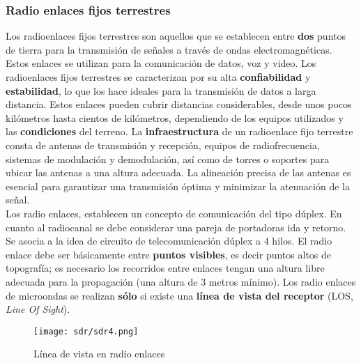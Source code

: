 \documentclass[
	12pt, %
	fleqn, %
	a4paper, %
	oneside, %
]{LegrandOrangeBook}
\begin{document}
\subsubsection{Radio enlaces fijos terrestres}
Los radioenlaces fijos terrestres son aquellos que se establecen entre \textbf{dos} puntos de tierra para la transmisión de señales a través de ondas electromagnéticas. Estos enlaces se utilizan para la comunicación de datos, voz y video. Los radioenlaces fijos terrestres se caracterizan por su alta \textbf{confiabilidad} y \textbf{estabilidad}, lo que los hace ideales para la transmisión de datos a larga distancia. Estos enlaces pueden cubrir distancias considerables, desde unos pocos kilómetros hasta cientos de kilómetros, dependiendo de los equipos utilizados y las \textbf{condiciones} del terreno. La \textbf{infraestructura} de un radioenlace fijo terrestre consta de antenas de transmisión y recepción, equipos de radiofrecuencia, sistemas de modulación y demodulación, así como de torres o soportes para ubicar las antenas a una altura adecuada. La alineación precisa de las antenas es esencial para garantizar una transmisión óptima y minimizar la atenuación de la señal.\\
Los radio enlaces, establecen un concepto de comunicación del tipo
dúplex. En cuanto al radiocanal se debe considerar una pareja de portadoras ida y retorno. Se asocia a la idea de circuito de telecomunicación dúplex a 4 hilos. El radio enlace debe ser básicamente entre \textbf{puntos visibles}, es decir puntos altos de topografía; es necesario los recorridos entre enlaces tengan una altura libre
adecuada para la propagación (una altura de 3 metros mínimo). Los radio enlaces de microondas se realizan \textbf{sólo} si existe una \textbf{línea de vista del receptor} (LOS, \textit{Line Of Sight}).
\begin{figure}[H]
\centering
\texttt{[image: sdr/sdr4.png]}
\caption{Línea de vista en radio enlaces}
\end{figure}
\end{document}
